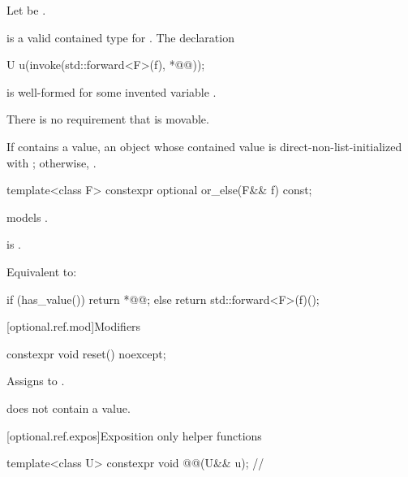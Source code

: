 \begin{itemdescr}
\pnum
  Let  be .

\pnum
\mandates
{} is a valid contained type for .
The declaration
\begin{codeblock}
U u(invoke(std::forward<F>(f), *@@));
\end{codeblock}
is well-formed for some invented variable .
\begin{note}
There is no requirement that  is movable.
\end{note}

\pnum
\returns
If  contains a value, an  object
whose contained value is direct-non-list-initialized with
;
otherwise, .
\end{itemdescr}

\begin{itemdecl}
template<class F> constexpr optional or_else(F&& f) const;
\end{itemdecl}

\begin{itemdescr}
\pnum
\constraints
{} models .

\pnum
\mandates
{} is .

\pnum
\effects
Equivalent to:
\begin{codeblock}
if (has_value()) {
  return *@@;
} else {
  return std::forward<F>(f)();
}
\end{codeblock}
\end{itemdescr}

[optional.ref.mod]{Modifiers}

\begin{itemdecl}
constexpr void reset() noexcept;
\end{itemdecl}

\begin{itemdescr}
\pnum
\effects
Assigns  to .

\pnum
\ensures
{} does not contain a value.
\end{itemdescr}

[optional.ref.expos]{Exposition only helper functions}

\begin{itemdecl}
template<class U>
  constexpr void @@(U&& u);  // \expos
\end{itemdecl}

